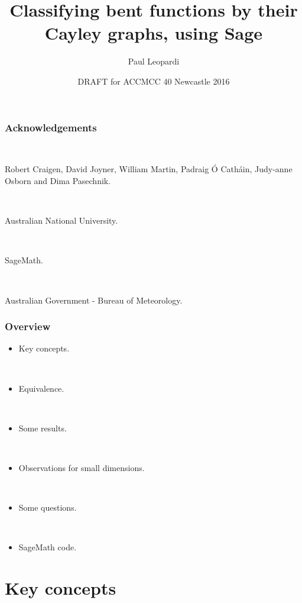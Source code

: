 \documentclass[pdf,sprung,slideColor,nocolorBG]{beamer}
\title{Classifying bent functions by their Cayley graphs, using Sage}
\author{Paul Leopardi}
\date{DRAFT for ACCMCC 40 Newcastle 2016}
\institute{Australian Government - Bureau of Meteorology.}
\begin{document}
\frame{\titlepage}
\begin{frame}
\frametitle{Acknowledgements}
\begin{center}
~
 
Robert Craigen, David Joyner, William Martin,
Padraig {\'O} Cath{\'a}in,
Judy-anne Osborn and Dima Pasechnik.

~

Australian National University.

~

SageMath.

~

Australian Government - Bureau of Meteorology.
\end{center}
\end{frame}

\begin{frame}
\frametitle{Overview}
\begin{itemize}
\item
Key concepts.

~

\item
Equivalence.

~

\item
Some results.

~

\item
Observations for small dimensions.

~

\item
Some questions.

~

\item
SageMath code.
\end{itemize}
 
\end{frame}

\section{Key concepts}
\end{document}
